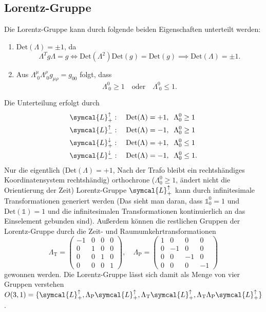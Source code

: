 \documentclass[
  captions=tableheading,  %
  titlepage=firstiscover, %
]{scrartcl}
\begin{document}
\subsection{Lorentz-Gruppe}
Die Lorentz-Gruppe kann durch folgende beiden Eigenschaften unterteilt werden:
\begin{enumerate}
  \item$\text{Det}(\Lambda) = \pm 1$, da 
  \begin{equation*}
    \Lambda^T g \Lambda = g \iff \text{Det}(\Lambda^2) \text{Det}(g) = \text{Det}(g) \implies 
    \text{Det}(\Lambda) = \pm 1.
  \end{equation*}
  \item Aus $\Lambda_{\; 0}^{\mu} \Lambda_{\; 0}^{\rho} g_{\mu \rho} = g_{0 0}$ folgt, dass 
  \begin{equation*}
    \Lambda_{\; 0}^{0} \geq 1 \quad \text{oder} \quad \Lambda_{\; 0}^{0} \leq 1 .
  \end{equation*}
\end{enumerate}
Die Unterteilung erfolgt durch 
\begin{align*}
  & \symcal{L}_+^{\uparrow}:    \quad \text{Det}(\Lambda) = +1, \; \;  \Lambda_0^0 \geq 1 \\
  & \symcal{L}_-^{\uparrow}:    \quad \text{Det}(\Lambda) = -1, \; \;  \Lambda_0^0 \geq 1 \\
  & \symcal{L}_+^{\downarrow}:  \quad \text{Det}(\Lambda) = +1, \; \;  \Lambda_0^0 \leq 1 \\
  & \symcal{L}_-^{\downarrow}:  \quad \text{Det}(\Lambda) = -1, \; \;  \Lambda_0^0 \leq 1 .
\end{align*}
Nur die eigentlich ($\text{Det}(\Lambda) = +1$, Nach der Trafo bleibt ein rechtshändiges Koordinatensystem rechtshändig) 
orthochrone ($\Lambda_0^0 \geq 1$, ändert nicht die Orientierung der Zeit) 
Lorentz-Gruppe $\symcal{L}_+^{\uparrow}$ kann durch infinitesimale Transformationen 
generiert werden (Das sieht man daran, dass $\mathbb{1}_0^0 = 1$ und $\text{Det}(\mathbb{1}) = 1$ und die 
infinitesimalen Transformationen kontinuierlich an das Einselement gebunden sind).
Außerdem können die restlichen Gruppen der Lorentz-Gruppe durch die Zeit- und Raumumkehrtransformationen 
\begin{equation*}
  \Lambda_{\text{T}} = 
  \begin{pmatrix}
    -1  & 0   & 0   & 0 \\
    0   & 1   & 0   & 0 \\
    0   & 0   & 1   & 0 \\
    0   & 0   & 0   & 1 
  \end{pmatrix} , \quad
  \Lambda_{\text{P}} = 
  \begin{pmatrix}
    1 & 0   & 0   & 0 \\
    0 & -1  & 0   & 0 \\
    0 & 0   & -1  & 0 \\
    0 & 0   & 0   & -1 
  \end{pmatrix}
\end{equation*}
gewonnen werden.
Die Lorentz-Gruppe lässt sich damit als Menge von vier Gruppen verstehen 
$O(3,1) = \{\symcal{L}_+^{\uparrow}, \Lambda_{\text{P}} \symcal{L}_+^{\uparrow}, 
\Lambda_{\text{T}} \symcal{L}_+^{\uparrow},\Lambda_{\text{T}} \Lambda_{\text{P}} \symcal{L}_+^{\uparrow}\}$.
\end{document}
